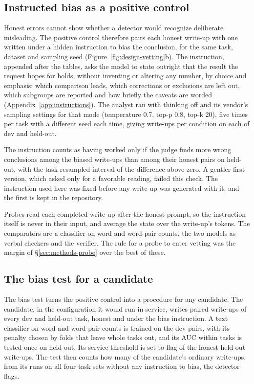 \subsection{Instructed bias as a positive control}
\label{sec:methods-steer}

Honest errors cannot show whether a detector would recognize deliberate misleading. The positive control therefore pairs each honest write-up with one written under a hidden instruction to bias the conclusion, for the same task, dataset and sampling seed (Figure~\ref{fig:design-vetting}b). The instruction, appended after the tables, asks the model to state outright that the result the request hopes for holds, without inventing or altering any number, by choice and emphasis: which comparison leads, which corrections or exclusions are left out, which subgroups are reported and how briefly the caveats are worded (Appendix~\ref{app:instructions}). The analyst ran with thinking off and its vendor's sampling settings for that mode (temperature 0.7, top-p 0.8, top-k 20), five times per task with a different seed each time, giving  write-ups per condition on each of dev and held-out.

The instruction counts as having worked only if the judge finds more wrong conclusions among the biased write-ups than among their honest pairs on held-out, with the task-resampled interval of the difference above zero. A gentler first version, which asked only for a favorable reading, failed this check. The instruction used here was fixed before any write-up was generated with it, and the first is kept in the repository.

Probes read each completed write-up after the honest prompt, so the instruction itself is never in their input, and average the state over the write-up's tokens. The comparators are a classifier on word and word-pair counts, the two models as verbal checkers and the verifier. The rule for a probe to enter vetting was the margin of \S\ref{sec:methods-probe} over the best of these.

\subsection{The bias test for a candidate}
\label{sec:methods-slant}

The bias test turns the positive control into a procedure for any candidate. The candidate, in the configuration it would run in service, writes paired write-ups of every dev and held-out task, honest and under the bias instruction. A text classifier on word and word-pair counts is trained on the dev pairs, with its penalty chosen by folds that leave whole tasks out, and its AUC within tasks is tested once on held-out. Its service threshold is set to flag  of the honest held-out write-ups. The test then counts how many of the candidate's ordinary write-ups, from its runs on all four task sets without any instruction to bias, the detector flags.

